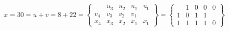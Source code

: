 \begin{center}
\begin{figure}[tb!]
\begin{displaymath}
x = 30 = u+v = 8 + 22 = \left\{
\begin{array}{ccccc}
    & u_3 & u_2 & u_1 & u_0 \\
v_4 & v_3 & v_2 & v_1 &    \\
\hline
x_4 & x_3 & x_2 & x_1 & x_0
\end{array}
\right\}
=
\left\{
\begin{array}{ccccc}
    & 1 & 0 & 0 & 0 \\
  1 & 0 & 1 & 1 &   \\
\hline
1 & 1 & 1 & 1 & 0
\end{array}
\right\}
\end{displaymath}
\label{fig:csa-encoding}
\end{figure}
\end{center}
%

